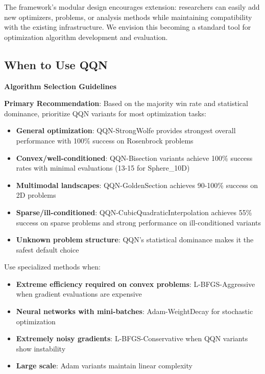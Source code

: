 The framework's modular design encourages extension: researchers can easily add new optimizers, problems, or analysis methods while maintaining compatibility with the existing infrastructure. We envision this becoming a standard tool for optimization algorithm development and evaluation.

\hypertarget{when-to-use-qqn}{%
\subsection{When to Use QQN}\label{when-to-use-qqn}}

\textbf{Algorithm Selection Guidelines}

\textbf{Primary Recommendation}: Based on the majority win rate and statistical dominance, prioritize QQN variants for most optimization tasks:

\begin{itemize}
\tightlist
\item
  \textbf{General optimization}: QQN-StrongWolfe provides strongest overall performance with 100\% success on Rosenbrock problems
\item
  \textbf{Convex/well-conditioned}: QQN-Bisection variants achieve 100\% success rates with minimal evaluations (13-15 for Sphere\_10D)
\item
  \textbf{Multimodal landscapes}: QQN-GoldenSection achieves 90-100\% success on 2D problems
\item
  \textbf{Sparse/ill-conditioned}: QQN-CubicQuadraticInterpolation achieves 55\% success on sparse problems and strong performance on ill-conditioned variants
\item
  \textbf{Unknown problem structure}: QQN's statistical dominance makes it the safest default choice
\end{itemize}

Use specialized methods when:

\begin{itemize}
\tightlist
\item
  \textbf{Extreme efficiency required on convex problems}: L-BFGS-Aggressive when gradient evaluations are expensive
\item
  \textbf{Neural networks with mini-batches}: Adam-WeightDecay for stochastic optimization
\item
  \textbf{Extremely noisy gradients}: L-BFGS-Conservative when QQN variants show instability
\item
  \textbf{Large scale}: Adam variants maintain linear complexity
\end{itemize}

